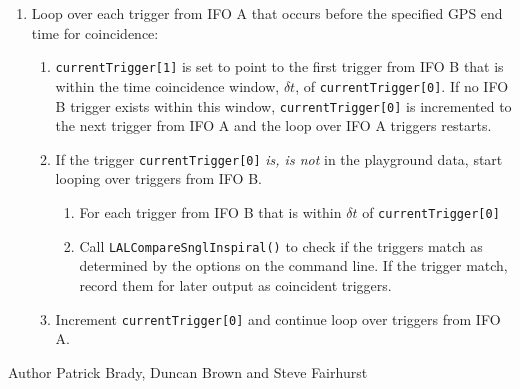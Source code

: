 \begin{entry}
\begin{enumerate}
\item Loop over each trigger from IFO A that occurs before the specified GPS
end time for coincidence:
\begin{enumerate}
\item \texttt{currentTrigger[1]} is set to point to the first trigger from IFO
B that is within the time coincidence window, $\delta t$, of
\texttt{currentTrigger[0]}. If no IFO B trigger exists within this window,
\texttt{currentTrigger[0]} is incremented to the next trigger from IFO A and
the loop over IFO A triggers restarts.

\item If the trigger \texttt{currentTrigger[0]} \emph{is, is not} in the
playground data, start looping over triggers from IFO B.
\begin{enumerate}
\item For each trigger from IFO B that is within $\delta t$ of
\texttt{currentTrigger[0]}
\item Call \texttt{LALCompareSnglInspiral()} to check if the triggers match as
determined by the options on the command line. If the trigger match, record
them for later output as coincident triggers.
\end{enumerate}

\item Increment \texttt{currentTrigger[0]} and continue loop over triggers
from IFO A.
\end{enumerate}
\end{enumerate}

\item[Author] 
Patrick Brady, Duncan Brown and Steve Fairhurst
\end{entry}


